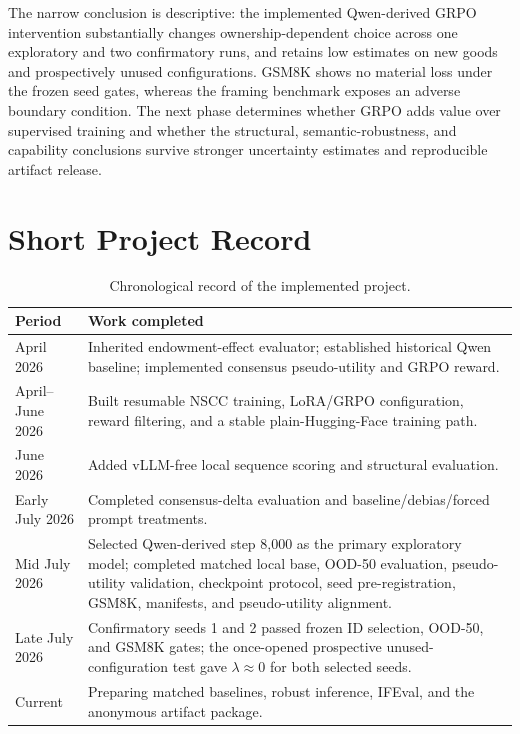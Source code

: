 \documentclass[11pt,letterpaper]{article}
\begin{document}
The narrow conclusion is descriptive: the implemented Qwen-derived GRPO
intervention substantially changes ownership-dependent choice across one
exploratory and two confirmatory runs, and retains low estimates on new goods
and prospectively unused configurations. GSM8K shows no material loss under
the frozen seed gates, whereas the framing benchmark exposes an adverse
boundary condition. The next phase determines whether GRPO adds value over
supervised training and whether the structural, semantic-robustness, and
capability conclusions survive stronger uncertainty estimates and reproducible
artifact release.

\clearpage
\section{Short Project Record}

\begin{table}[htbp]
\centering
\small
\begin{tabular}{lp{}}
\toprule
Period & Work completed \\
\midrule
April 2026 & Inherited endowment-effect evaluator; established historical Qwen baseline; implemented consensus pseudo-utility and GRPO reward. \\
April--June 2026 & Built resumable NSCC training, LoRA/GRPO configuration, reward filtering, and a stable plain-Hugging-Face training path. \\
June 2026 & Added vLLM-free local sequence scoring and structural evaluation. \\
Early July 2026 & Completed consensus-delta evaluation and baseline/debias/forced prompt treatments. \\
Mid July 2026 & Selected Qwen-derived step 8,000 as the primary exploratory model; completed matched local base, OOD-50 evaluation, pseudo-utility validation, checkpoint protocol, seed pre-registration, GSM8K, manifests, and pseudo-utility alignment. \\
Late July 2026 & Confirmatory seeds 1 and 2 passed frozen ID selection, OOD-50, and GSM8K gates; the once-opened prospective unused-configuration test gave $\lambda\approx0$ for both selected seeds. \\
Current & Preparing matched baselines, robust inference, IFEval, and the anonymous artifact package. \\
\bottomrule
\end{tabular}
\caption{Chronological record of the implemented project.}
\label{tab:timeline}
\end{table}

\FloatBarrier


\end{document}
